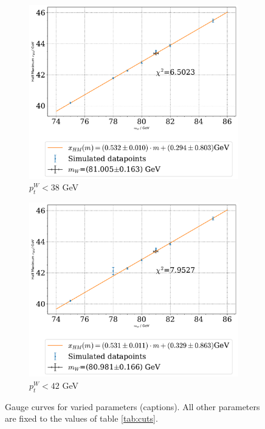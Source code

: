 \documentclass[11pt,a4paper,notitlepage]{scrartcl}
\begin{document}
\begin{figure}[H]
\begin{subfigure}{0.49\linewidth}
		\includegraphics[width=\linewidth]{P1_pics/gauge_results/gauge_ptw_ll.pdf}
		\caption{$p_t^W<38$ GeV}
	\end{subfigure}
	\begin{subfigure}{0.49\linewidth}
		\includegraphics[width=\linewidth]{P1_pics/gauge_results/gauge_ptw_ul.pdf}
		\caption{$p_t^W<42$ GeV}
	\end{subfigure}
	\caption{Gauge curves for varied parameters (captions). All other parameters are fixed to the values of table \ref{tab:cuts}.}
\end{figure}
\end{document}
